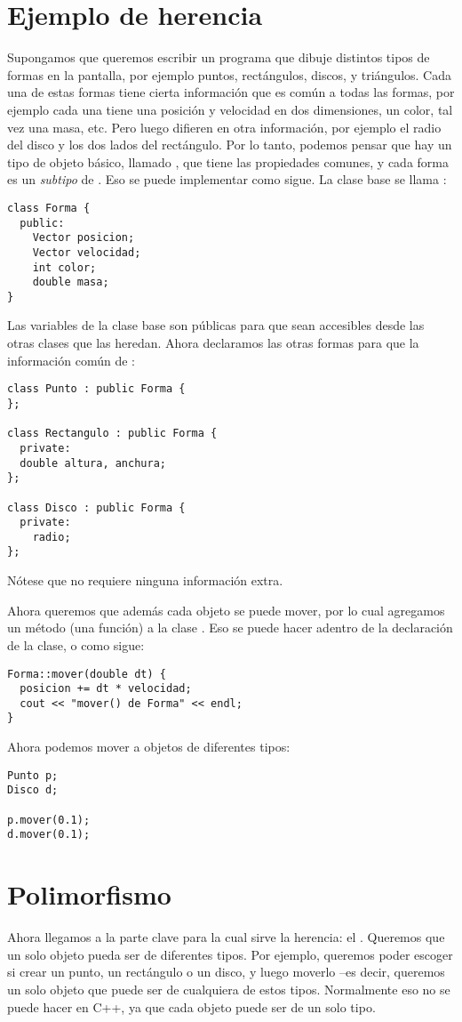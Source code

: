 \section{Ejemplo de herencia}
Supongamos que queremos escribir un programa que dibuje distintos tipos de formas en la pantalla, por ejemplo puntos, rectángulos, discos, y triángulos.
Cada una de estas formas tiene cierta información que es común a todas las formas, por ejemplo cada una tiene una posición y velocidad en dos dimensiones, un color, tal vez una masa, etc. Pero luego difieren en otra información, por ejemplo el radio del disco y los dos lados del rectángulo.
Por lo tanto, podemos pensar que hay un tipo de objeto básico, llamado , que tiene las propiedades comunes, y cada forma es un \emph{subtipo} de . Eso se puede implementar como sigue. La clase base se llama :
\begin{lstlisting}
class Forma {
  public:
	Vector posicion;
	Vector velocidad;
	int color;
	double masa;
}
\end{lstlisting}
Las variables de la clase base son públicas para que sean accesibles desde las otras clases que las heredan.
Ahora declaramos las otras formas para que  la información común de :
\begin{lstlisting}
class Punto : public Forma {
};

class Rectangulo : public Forma {   
  private:
  double altura, anchura;
};

class Disco : public Forma {
  private:
	radio;
};
\end{lstlisting}
Nótese que  no requiere ninguna información extra.

Ahora queremos que además cada objeto se puede mover, por lo cual agregamos un método (una función) a la clase .
Eso se puede hacer adentro de la declaración de la clase, o como sigue:
\begin{lstlisting}
Forma::mover(double dt) {
  posicion += dt * velocidad;	
  cout << "mover() de Forma" << endl;  
}
\end{lstlisting}

Ahora podemos mover a objetos de diferentes tipos:
\begin{lstlisting}
Punto p;
Disco d;

p.mover(0.1);
d.mover(0.1);
\end{lstlisting}

\section{Polimorfismo}
Ahora llegamos a la parte clave para la cual sirve la herencia: el .
Queremos que un solo objeto pueda ser de diferentes tipos. Por ejemplo, queremos poder escoger si crear un punto, un rectángulo o un disco,
y luego moverlo --es decir, queremos un solo objeto que puede ser de cualquiera de estos tipos. Normalmente eso no se puede hacer en C++, ya que cada objeto puede ser de un solo tipo.

